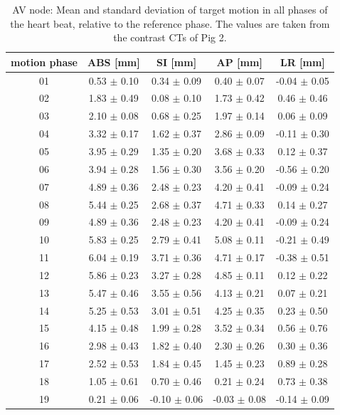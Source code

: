 \documentclass[type=dr, dr=rernat, accentcolor=tud7b,colorbacktitle, bigchapter, openright, twoside, 12pt ]{tudthesis}
\begin{document}
\begin{table}[htbp]
  \centering
    \tiny
  \caption{AV node: Mean and standard deviation of target motion in all phases of the heart beat, relative to the reference phase. The values are 
  taken from the contrast CTs of Pig 2.}
  \begin{tabular}{|c|c|c|c|c|}
    \hline\hline
    motion phase\rule{0pt}{2.6ex}\rule[-1.2ex]{0pt}{0pt} & ABS [mm] & SI [mm] & AP [mm] & LR [mm]\\
    \hline
01 &0.53 $\pm$ 0.10 &0.34 $\pm$ 0.09 &0.40 $\pm$ 0.07 &-0.04 $\pm$ 0.05 \\
02 &1.83 $\pm$ 0.49 &0.08 $\pm$ 0.10 &1.73 $\pm$ 0.42 &0.46 $\pm$ 0.46 \\
03 &2.10 $\pm$ 0.08 &0.68 $\pm$ 0.25 &1.97 $\pm$ 0.14 &0.06 $\pm$ 0.09 \\
04 &3.32 $\pm$ 0.17 &1.62 $\pm$ 0.37 &2.86 $\pm$ 0.09 &-0.11 $\pm$ 0.30 \\
05 &3.95 $\pm$ 0.29 &1.35 $\pm$ 0.20 &3.68 $\pm$ 0.33 &0.12 $\pm$ 0.37 \\
06 &3.94 $\pm$ 0.28 &1.56 $\pm$ 0.30 &3.56 $\pm$ 0.20 &-0.56 $\pm$ 0.20 \\
07 &4.89 $\pm$ 0.36 &2.48 $\pm$ 0.23 &4.20 $\pm$ 0.41 &-0.09 $\pm$ 0.24 \\
08 &5.44 $\pm$ 0.25 &2.68 $\pm$ 0.37 &4.71 $\pm$ 0.33 &0.14 $\pm$ 0.27 \\
09 &4.89 $\pm$ 0.36 &2.48 $\pm$ 0.23 &4.20 $\pm$ 0.41 &-0.09 $\pm$ 0.24 \\
10 &5.83 $\pm$ 0.25 &2.79 $\pm$ 0.41 &5.08 $\pm$ 0.11 &-0.21 $\pm$ 0.49 \\
11 &6.04 $\pm$ 0.19 &3.71 $\pm$ 0.36 &4.71 $\pm$ 0.17 &-0.38 $\pm$ 0.51 \\
12 &5.86 $\pm$ 0.23 &3.27 $\pm$ 0.28 &4.85 $\pm$ 0.11 &0.12 $\pm$ 0.22 \\
13 &5.47 $\pm$ 0.46 &3.55 $\pm$ 0.56 &4.13 $\pm$ 0.21 &0.07 $\pm$ 0.21 \\
14 &5.25 $\pm$ 0.53 &3.01 $\pm$ 0.51 &4.25 $\pm$ 0.35 &0.23 $\pm$ 0.50 \\
15 &4.15 $\pm$ 0.48 &1.99 $\pm$ 0.28 &3.52 $\pm$ 0.34 &0.56 $\pm$ 0.76 \\
16 &2.98 $\pm$ 0.43 &1.82 $\pm$ 0.40 &2.30 $\pm$ 0.26 &0.30 $\pm$ 0.36 \\
17 &2.52 $\pm$ 0.53 &1.84 $\pm$ 0.45 &1.45 $\pm$ 0.23 &0.89 $\pm$ 0.28 \\
18 &1.05 $\pm$ 0.61 &0.70 $\pm$ 0.46 &0.21 $\pm$ 0.24 &0.73 $\pm$ 0.38 \\
19 &0.21 $\pm$ 0.06 &-0.10 $\pm$ 0.06 &-0.03 $\pm$ 0.08 &-0.14 $\pm$ 0.09 \\
    \hline\hline
  \end{tabular}
  \label{tab:motion:AV:Pig2}
\end{table}
\end{document}
